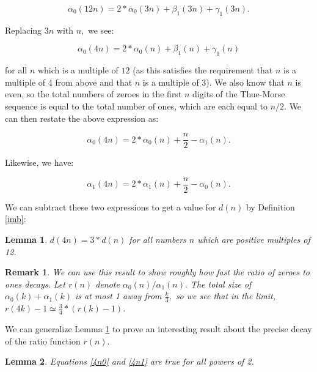 \documentclass{article}
\newtheorem{lemma}{Lemma}[section]
\newtheorem{remark}{Remark}[section]
\begin{document}
$$\alpha_0(12n) = 2 * \alpha_0(3n) + \beta_1(3n) + \gamma_1(3n).$$

Replacing $3n$ with $n,$ we see:

$$\alpha_0(4n) = 2 * \alpha_0(n) + \beta_1(n) + \gamma_1(n)$$

for all $n$ which is a multiple of $12$ (as this satisfies the requirement that $n$ is a multiple of 4 from above and that $n$ is a multiple of 3).
We also know that $n$ is even, so the total numbers of zeroes in the first $n$ digits of the Thue-Morse sequence is equal to the total number of ones, which are each equal to $n/2.$ We can then restate the above expression as:

\begin{equation}
\label{4n0}
\alpha_0(4n) = 2 * \alpha_0(n) + \frac{n}{2} - \alpha_1(n).
\end{equation}

Likewise, we have:

\begin{equation}
\label{4n1}
\alpha_1(4n) = 2 * \alpha_1(n) + \frac{n}{2} - \alpha_0(n).
\end{equation}

We can subtract these two expressions to get a value for $d(n)$ by Definition \ref{imb}:

\begin{lemma}
\label{ratiospec}
$d(4n) = 3 * d(n)$ for all numbers $n$ which are positive multiples of 12.
\end{lemma}

\begin{remark}
We can use this result to show roughly how fast the ratio of zeroes to ones decays. Let $r(n)$ denote $\alpha_0(n)/\alpha_1(n).$ The total size of $\alpha_0(k) + \alpha_1(k)$ is at most 1 away from $\frac{k}{3},$ so we see that in the limit, $r(4k) - 1 \simeq \frac{3}{4} * (r(k) - 1).$
\end{remark}

We can generalize Lemma \ref{ratiospec} to prove an interesting result about the precise decay of the ratio function $r(n).$

\begin{lemma}
Equations \ref{4n0} and \ref{4n1} are true for all powers of 2.
\end{lemma}
\end{document}
